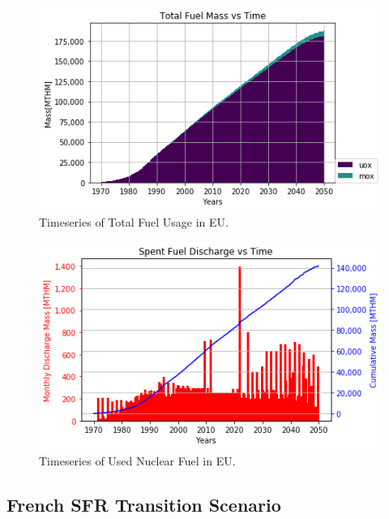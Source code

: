 	\begin{figure}[htbp!]
		\begin{center}
			\includegraphics[width=\columnwidth]{./images/eu_future/total_fuel.png}
		\end{center}
		\caption{Timeseries of Total Fuel Usage in \gls{EU}.}
		\label{fig:eu_fuel}
	\end{figure}
	
	\begin{figure}[htbp!]
		\begin{center}
			\includegraphics[width=\columnwidth]{./images/eu_future/snf_discharge.png}
		\end{center}
		\caption{Timeseries of Used Nuclear Fuel in \gls{EU}.}
		\label{fig:eu_snf}
	\end{figure}
	\FloatBarrier

	\subsection{French \gls{SFR} Transition Scenario}
	
